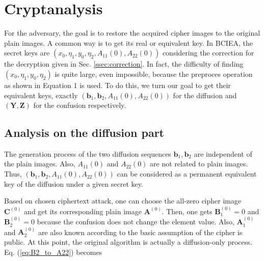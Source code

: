 \documentclass[final,3p,times,twocolumn]{elsarticle}
\begin{document}
\section{Cryptanalysis}
\label{sec3:Cryptanalysis}

For the adversary, the goal is to restore the acquired cipher images to the original plain images. A common way is to get its real or equivalent key. In BCIEA, the secret keys are $(x_0,\eta_1,y_0,\eta_2,A_{11}(0),A_{22}(0))$ considering the correction for the decryption given in Sec. \ref{ssec:correction}. 
In fact, the difficulty of finding $(x_0,\eta_1,y_0,\eta_2)$ is quite large, even impossible, because the preproces operation as shown in Equation 1 is used. To do this, we turn our goal to get their equivalent keys, exactly $(\bm{b}_1,\bm{b}_2,A_{11}(0),A_{22}(0))$ for the diffusion and $(\bm{Y},\bm{Z})$ for the confusion respectively.



\subsection{Analysis on the diffusion part}
\label{ssec:break_diffusion}
The generation process of the two diffusion sequences $\bm{b}_1,\bm{b}_2$ are independent of the plain images. Also, $A_{11}(0)$ and $A_{22}(0)$ are not related to plain images. Thus, $(\bm{b}_1,\bm{b}_2,A_{11}(0),A_{22}(0))$ can be considered as a permanent equivalent key of the diffusion under a given secret key. 


Based on chosen ciphertext attack, one can choose the all-zero cipher image $\bm{C}^{(0)}$ and get its corresponding plain image $\bm{A}^{(0)}$. Then, one gets $\bm{B}_1^{(0)}=0$ and $\bm{B}_2^{(0)}=0$ because the confusion does not change the element value. Also, $\bm{A}_1^{(0)}$ and $\bm{A}_2^{(0)}$ are also known according to the basic assumption of the cipher is public. At this point, the original algorithm is actually a diffusion-only process.
Eq. (\ref{eq:B2_to_A22}) becomes
\end{document}
